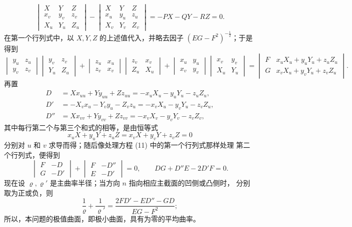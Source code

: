 \documentclass[11pt,a4paper,leqno]{article}
\begin{document}
\begin{equation}\tag{11}
\begin{vmatrix}
X&Y&Z\\
x_v&y_v&z_v\\
X_u&Y_u&Z_u
\end{vmatrix}
-
\begin{vmatrix}
X&Y&Z\\
x_u&y_u&z_u\\
X_v&Y_v&Z_v
\end{vmatrix}
=-PX-QY-RZ=0.
\end{equation}
在第一个行列式中，以 $X,Y,Z$ 的上述值代入，并略去因子
$(EG-F^2)^{-\frac12}$；于是得到
\[
\begin{vmatrix}y_u&z_u\\y_v&z_v\end{vmatrix}
\begin{vmatrix}y_v&z_v\\Y_u&Z_u\end{vmatrix}
+
\begin{vmatrix}z_u&x_u\\z_v&x_v\end{vmatrix}
\begin{vmatrix}z_v&x_v\\Z_u&X_u\end{vmatrix}
+
\begin{vmatrix}x_u&y_u\\x_v&y_v\end{vmatrix}
\begin{vmatrix}x_v&y_v\\X_u&Y_u\end{vmatrix}
=
\begin{vmatrix}
F&x_uX_u+y_uY_u+z_uZ_u\\
G&x_vX_u+y_vY_u+z_vZ_u
\end{vmatrix}.
\]
再置
\[
\begin{aligned}
D&=Xx_{uu}+Yy_{uu}+Zz_{uu}
=-x_uX_u-y_uY_u-z_uZ_u,\\
D'&=-X_vx_u-Y_vy_u-Z_vz_u
=-x_vX_u-y_vY_u-z_vZ_u,\\
D''&=Xx_{vv}+Yy_{vv}+Zz_{vv}
=-x_vX_v-y_vY_v-z_vZ_v,
\end{aligned}
\]
其中每行第二个与第三个和式的相等，是由恒等式
\[
x_uX+y_uY+z_uZ=x_vX+y_vY+z_vZ=0
\]
分别对 $u$ 和 $v$ 求导而得；随后像处理方程 (11) 中的第一个行列式那样处理
第二个行列式，便得到
\[
\begin{vmatrix}F&-D\\G&-D'\end{vmatrix}
+\begin{vmatrix}F&-D''\\E&-D'\end{vmatrix}=0,
\qquad DG+D''E-2D'F=0.
\]
现在设 $\varrho,\varrho'$ 是主曲率半径；当方向 $n$ 指向相应主截面的凹侧或凸侧时，
分别取为正或负，则
\begin{equation}\tag{12}
\frac{1}{\varrho}+\frac{1}{\varrho'}
=\frac{2FD'-ED''-GD}{EG-F^2};
\end{equation}
所以，本问题的极值曲面，即极小曲面，具有为零的平均曲率。
\end{document}
